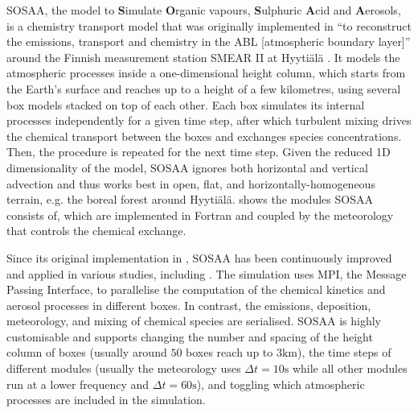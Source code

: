 \newpar SOSAA, the model to \textbf{S}imulate \textbf{O}rganic vapours, \textbf{S}ulphuric \textbf{A}cid and \textbf{A}erosols, is a chemistry transport model that was originally implemented in \textcite{sosa-description-2011} ``to reconstruct the emissions, transport and chemistry in the ABL [atmospheric boundary layer]'' \cite{sosa-description-2011} around the Finnish measurement station SMEAR II at Hyyti\"al\"a \cite{smear-station-2013}. It models the atmospheric processes inside a one-dimensional height column, which starts from the Earth's surface and reaches up to a height of a few kilometres, using several box models stacked on top of each other. Each box simulates its internal processes independently for a given time step, after which turbulent mixing drives the chemical transport between the boxes and exchanges species concentrations. Then, the procedure is repeated for the next time step. Given the reduced 1D dimensionality of the model, SOSAA ignores both horizontal and vertical advection and thus works best in open, flat, and horizontally-homogeneous terrain, e.g. the boreal forest around Hyyti\"al\"a.  shows the modules SOSAA consists of, which are implemented in Fortran and coupled by the meteorology that controls the chemical exchange.

\newpar Since its original implementation in \textcite{sosa-description-2011}, SOSAA has been continuously improved and applied in various studies, including \cite{sosaa-description-2014, sosaa-bvoc-2017, sosaa-ozone-2017, sosaa-trends-2021}. The simulation uses MPI, the Message Passing Interface, to parallelise the computation of the chemical kinetics and aerosol processes in different boxes. In contrast, the emissions, deposition, meteorology, and mixing of chemical species are serialised. SOSAA is highly customisable and supports changing the number and spacing of the height column of boxes (usually around $50$ boxes reach up to $3 \text{km}$), the time steps of different modules (usually the meteorology uses $\Delta t = 10 \text{s}$ while all other modules run at a lower frequency and $\Delta t = 60 \text{s}$), and toggling which atmospheric processes are included in the simulation.

